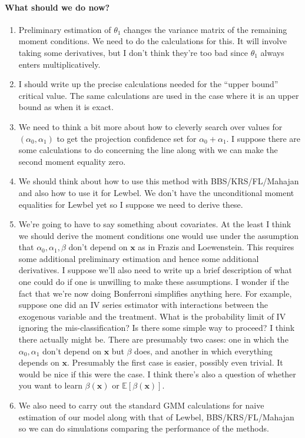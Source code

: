 \documentclass[12pt]{article}
\begin{document}
\paragraph{What should we do now?}
\begin{enumerate}
  \item Preliminary estimation of $\theta_1$ changes the variance matrix of the remaining moment conditions.
    We need to do the calculations for this.
    It will involve taking some derivatives, but I don't think they're too bad since $\theta_1$ always enters multiplicatively.
  \item I should write up the precise calculations needed for the ``upper bound'' critical value. 
    The same calculations are used in the case where it is an upper bound as when it is exact.
  \item We need to think a bit more about how to cleverly search over values for $(\alpha_0, \alpha_1)$ to get the projection confidence set for $\alpha_0 + \alpha_1$.
    I suppose there are some calculations to do concerning the line along with we can make the second moment equality zero.
  \item We should think about how to use this method with BBS/KRS/FL/Mahajan and also how to use it for Lewbel.
    We don't have the unconditional moment equalities for Lewbel yet so I suppose we need to derive these.
  \item We're going to have to say something about covariates.
    At the least I think we should derive the moment conditions one would use under the assumption that $\alpha_0, \alpha_1, \beta$ don't depend on $\mathbf{x}$ as in Frazis and Loewenstein.
    This requires some additional preliminary estimation and hence some additional derivatives.
    I suppose we'll also need to write up a brief description of what one could do if one is unwilling to make these assumptions.
    I wonder if the fact that we're now doing Bonferroni simplifies anything here.
    For example, suppose one did an IV series estimator with interactions between the exogenous variable and the treatment.
    What is the probability limit of IV ignoring the mis-classification?
    Is there some simple way to proceed? 
    I think there actually might be.
    There are presumably two cases: one in which the $\alpha_0, \alpha_1$ don't depend on $\mathbf{x}$ but $\beta$ does, and another in which everything depends on $\mathbf{x}$. 
    Presumably the first case is easier, possibly even trivial.
    It would be nice if this were the case.
    I think there's also a question of whether you want to learn $\beta(\mathbf{x})$ or $\mathbb{E}[\beta(\mathbf{x})]$.
  \item We also need to carry out the standard GMM calculations for naive estimation of our model along with that of Lewbel, BBS/KRS/FL/Mahajan so we can do simulations comparing the performance of the methods.
\end{enumerate}
\end{document}
